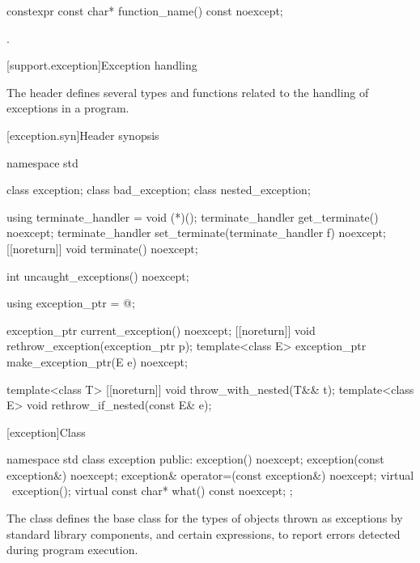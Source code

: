 \begin{itemdecl}
constexpr const char* function_name() const noexcept;
\end{itemdecl}
\begin{itemdescr}
\pnum
\returns
{}.
\end{itemdescr}

[support.exception]{Exception handling}

\pnum
The header
defines several types and functions related to the handling of exceptions in a \Cpp{} program.

[exception.syn]{Header  synopsis}
%

\begin{codeblock}
namespace std {
  class exception;
  class bad_exception;
  class nested_exception;

  using terminate_handler = void (*)();
  terminate_handler get_terminate() noexcept;
  terminate_handler set_terminate(terminate_handler f) noexcept;
  [[noreturn]] void terminate() noexcept;

  int uncaught_exceptions() noexcept;

  using exception_ptr = @\unspec@;

  exception_ptr current_exception() noexcept;
  [[noreturn]] void rethrow_exception(exception_ptr p);
  template<class E> exception_ptr make_exception_ptr(E e) noexcept;

  template<class T> [[noreturn]] void throw_with_nested(T&& t);
  template<class E> void rethrow_if_nested(const E& e);
}
\end{codeblock}

[exception]{Class }

%
%
\begin{codeblock}
namespace std {
  class exception {
  public:
    exception() noexcept;
    exception(const exception&) noexcept;
    exception& operator=(const exception&) noexcept;
    virtual ~exception();
    virtual const char* what() const noexcept;
  };
}
\end{codeblock}

\pnum
The class
defines the base
class for the types of objects thrown as exceptions by
\Cpp{} standard library components, and certain
expressions, to report errors detected during program execution.

